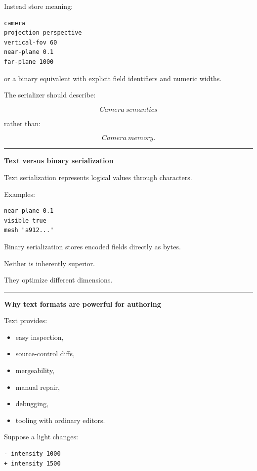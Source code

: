 Instead store meaning:

\begin{verbatim}
camera
projection perspective
vertical-fov 60
near-plane 0.1
far-plane 1000
\end{verbatim}

or a binary equivalent with explicit field identifiers and numeric widths.

The serializer should describe:

\[
\boxed{
Camera\ semantics
}
\]

rather than:

\[
\boxed{
Camera\ memory.
}
\]

\begin{center}\rule{0.5\linewidth}{0.5pt}\end{center}

\textbf{Text versus binary serialization}

Text serialization represents logical values through characters.

Examples:

\begin{verbatim}
near-plane 0.1
visible true
mesh "a912..."
\end{verbatim}

Binary serialization stores encoded fields directly as bytes.

Neither is inherently superior.

They optimize different dimensions.

\begin{center}\rule{0.5\linewidth}{0.5pt}\end{center}

\textbf{Why text formats are powerful for authoring}

Text provides:

\begin{itemize}
\tightlist
\item
  easy inspection,
\item
  source-control diffs,
\item
  mergeability,
\item
  manual repair,
\item
  debugging,
\item
  tooling with ordinary editors.
\end{itemize}

Suppose a light changes:

\begin{verbatim}
- intensity 1000
+ intensity 1500
\end{verbatim}

